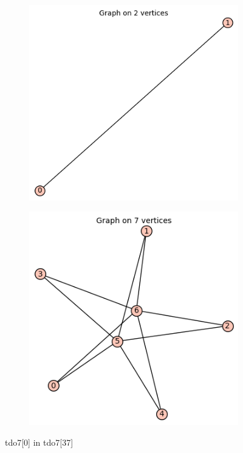 \documentclass[12pt, a4paper]{article}
\begin{document}
\begin{center}
\begin{figure}[!htb]
\centering
\begin{subfigure}{0.5\textwidth}
  \centering
  \includegraphics[width=0.4\linewidth]{tdo7[0]}
\end{subfigure}%
\begin{subfigure}{0.5\textwidth}
  \centering
  \includegraphics[width=0.45\linewidth]{tdo7[37]}
\end{subfigure}
\caption{tdo7[0] in tdo7[37]}
\label{fig:test}
\end{figure}


\end{center}
\end{document}
